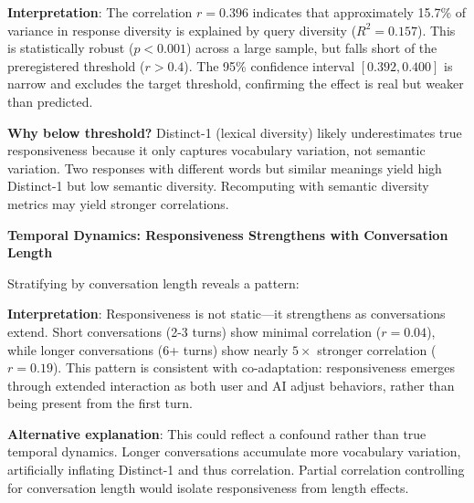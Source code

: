 \textbf{Interpretation}: The correlation $r = 0.396$ indicates that approximately 15.7\% of variance in response diversity is explained by query diversity ($R^2 = 0.157$). This is statistically robust ($p < 0.001$) across a large sample, but falls short of the preregistered threshold ($r > 0.4$). The 95\% confidence interval $[0.392, 0.400]$ is narrow and excludes the target threshold, confirming the effect is real but weaker than predicted.

\textbf{Why below threshold?} Distinct-1 (lexical diversity) likely underestimates true responsiveness because it only captures vocabulary variation, not semantic variation. Two responses with different words but similar meanings yield high Distinct-1 but low semantic diversity. Recomputing with semantic diversity metrics may yield stronger correlations.

\textbf{Temporal Dynamics: Responsiveness Strengthens with Conversation Length}

Stratifying by conversation length reveals a pattern:

\begin{table}[htbp]
\centering
{}
\end{table}

\textbf{Interpretation}: Responsiveness is not static---it strengthens as conversations extend. Short conversations (2-3 turns) show minimal correlation ($r = 0.04$), while longer conversations (6+ turns) show nearly $5\times$ stronger correlation ($r = 0.19$). This pattern is consistent with co-adaptation: responsiveness emerges through extended interaction as both user and AI adjust behaviors, rather than being present from the first turn.

\textbf{Alternative explanation}: This could reflect a confound rather than true temporal dynamics. Longer conversations accumulate more vocabulary variation, artificially inflating Distinct-1 and thus correlation. Partial correlation controlling for conversation length would isolate responsiveness from length effects.

